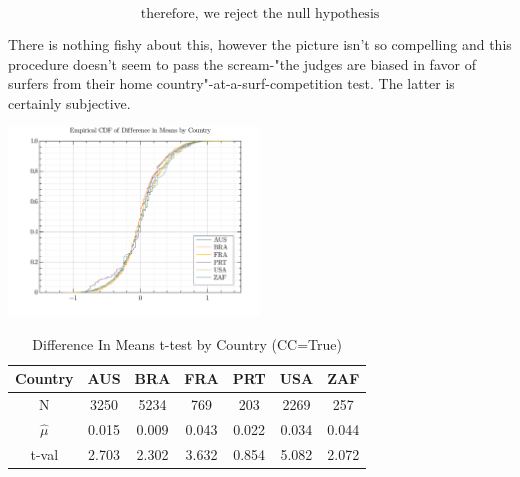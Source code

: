 \documentclass{article}
\begin{document}
\[\text{therefore, we reject the null hypothesis}\]


There is nothing fishy about this, however the picture isn't so compelling and this procedure doesn't seem to pass the scream-"the judges are biased in favor of surfers from their home country"-at-a-surf-competition test. The latter is certainly subjective.




\includegraphics[width=0.5\textwidth]{./visuals/ttests/CCtrue/EmpDiffInMeansCDF.png}
\begin{table}
\caption{Difference In Means t-test by Country (CC=True)}
\label{DiffInMeansttestsCCtrue}
\begin{center} \begin{tabular}{|c|c|c|c|c|c|c|} \hline
Country & AUS & BRA & FRA & PRT & USA & ZAF  \\ \hline
N & 3250 & 5234 & 769 & 203 & 2269 & 257  \\ \hline
$\hat{\mu}$ & 0.015 & 0.009 & 0.043 & 0.022 & 0.034 & 0.044  \\ \hline
t-val  & 2.703 & 2.302 & 3.632 & 0.854 & 5.082 & 2.072  \\ \hline
\end{tabular} \end{center}
\end{table}

\end{document}
